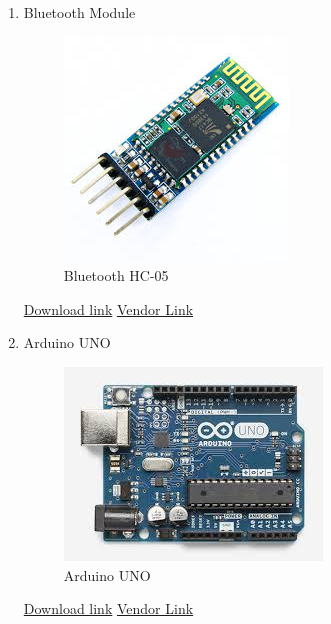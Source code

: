 \documentclass[a4paper,12pt,oneside]{book}
\begin{document}
\begin{itemize}
\begin{enumerate}
      \item Bluetooth Module      \\
      \begin{figure}[H]
        \centering
        \includegraphics[scale=0.6]{blue}
        \caption{Bluetooth HC-05}
      \end{figure}
      \href{http://www.linotux.ch/arduino/HC-0305_serial_module_AT_commamd_set_201104_revised.pdf} {Download link}
      \href{http://www.amazon.in/Verve-VTA009-Bluetooth-Module-HC-05/dp/B00S15XTG8?tag=googinhydr18418-21&tag=googinkenshoo-21&ascsubtag=a4459339-54b9-4883-ac3e-2de2611b95a1} {Vendor Link}
      \item Arduino UNO   \\
      \begin{figure}[H]
        \centering
        \includegraphics[scale=0.6]{uno}
        \caption{Arduino UNO}
      \end{figure}
      \href{http://www.mouser.com/pdfdocs/Gravitech_ATMEGA328_datasheet.pdf} {Download link}
      \href{http://www.amazon.in/Arduino-UNO-board-DIP-ATmega328P/dp/B008GRTSV6} {Vendor Link}
  \end{enumerate}
\end{itemize}
\end{document}
